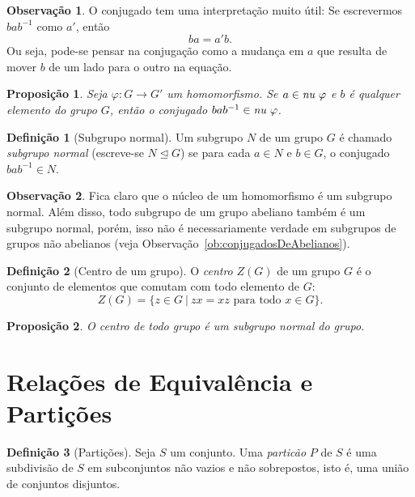 \documentclass[a4paper,12pt]{report}
\newcommand{\nucleoe}{\emph{\text{nu }}}
\theoremstyle{plain}
\newtheorem{proposicao}{Proposição}[section]
\theoremstyle{definition}
\newtheorem{definicao}{Definição}[section]
\newtheorem{observacao}{Observação}[section]
\begin{document}
\begin{observacao}
	O conjugado tem uma interpretação muito útil: Se escrevermos
	\(bab^{-1}\) como \(a'\), então \[ba = a'b.\] Ou seja, pode-se pensar na
	conjugação como a mudança em \(a\) que resulta de mover \(b\) de um lado
	para o outro na equação.
\end{observacao}		


\begin{proposicao}
	Seja $\varphi: G \longrightarrow G'$ um homomorfismo. Se \(a\in \nucleoe\varphi\) e \(b\) é qualquer elemento do grupo \(G\), então o conjugado \(bab^{-1} \in \nucleoe\varphi\).
\end{proposicao}

\begin{definicao}[Subgrupo normal]
	Um subgrupo \(N\) de um grupo \(G\) é chamado \emph{subgrupo normal} (escreve-se $N\trianglelefteq G$) se para cada \(a\in N\) e \(b\in G\), o conjugado
	\(bab^{-1} \in N\).
\end{definicao}

\begin{observacao}
	Fica claro que o núcleo de um homomorfismo é um subgrupo normal. Além disso, todo subgrupo de um grupo abeliano também é um subgrupo normal, porém, isso não é
	necessariamente verdade em subgrupos de grupos não abelianos (veja Observação~\ref{ob:conjugadosDeAbelianos}). 
\end{observacao}

\begin{definicao}[Centro de um grupo]
	O \emph{centro} \(Z(G)\) de um grupo \(G\) é o
	conjunto de elementos que comutam com todo elemento de \(G\):
	\[Z(G) = \{z \in G \ | \ zx = xz \text{ para todo } x \in G\}.\]
\end{definicao}

\begin{proposicao}
	O centro de todo grupo é um subgrupo normal do grupo.
\end{proposicao}

\section{Relações de Equivalência e Partições}

\begin{definicao}[Partições]
	Seja \(S\) um conjunto. Uma \emph{particão} \(P\) de
	\(S\) é uma subdivisão de \(S\) em subconjuntos não vazios e não
	sobrepostos, isto é, uma união de conjuntos disjuntos.	
\end{definicao}
\end{document}
